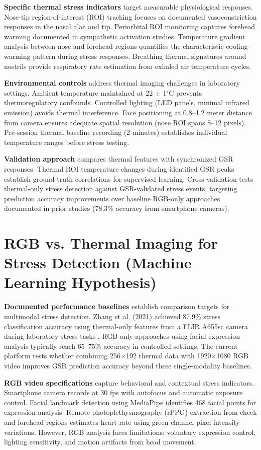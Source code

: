 \textbf{Specific thermal stress indicators} target measurable physiological responses. Nose-tip region-of-interest (ROI) tracking focuses on documented vasoconstriction responses in the nasal alae and tip. Periorbital ROI monitoring captures forehead warming documented in sympathetic activation studies. Temperature gradient analysis between nose and forehead regions quantifies the characteristic cooling-warming pattern during stress responses. Breathing thermal signatures around nostrils provide respiratory rate estimation from exhaled air temperature cycles.

\textbf{Environmental controls} address thermal imaging challenges in laboratory settings. Ambient temperature maintained at 22 $\pm$ 1$^\circ$C prevents thermoregulatory confounds. Controlled lighting (LED panels, minimal infrared emission) avoids thermal interference. Face positioning at 0.8--1.2 meter distance from camera ensures adequate spatial resolution (nose ROI spans 8--12 pixels). Pre-session thermal baseline recording (2 minutes) establishes individual temperature ranges before stress testing.

\textbf{Validation approach} compares thermal features with synchronized GSR responses. Thermal ROI temperature changes during identified GSR peaks establish ground truth correlations for supervised learning. Cross-validation tests thermal-only stress detection against GSR-validated stress events, targeting prediction accuracy improvements over baseline RGB-only approaches documented in prior studies (78.3\% accuracy from smartphone cameras).

\section{RGB vs. Thermal Imaging for Stress Detection (Machine Learning Hypothesis)}
\textbf{Documented performance baselines} establish comparison targets for multimodal stress detection. Zhang et al. (2021) achieved 87.9\% stress classification accuracy using thermal-only features from a FLIR A655sc camera during laboratory stress tasks \cite{ref5}. RGB-only approaches using facial expression analysis typically reach 65--75\% accuracy in controlled settings. The current platform tests whether combining 256$\times$192 thermal data with 1920$\times$1080 RGB video improves GSR prediction accuracy beyond these single-modality baselines.

\textbf{RGB video specifications} capture behavioral and contextual stress indicators. Smartphone camera records at 30 fps with autofocus and automatic exposure control. Facial landmark detection using MediaPipe identifies 468 facial points for expression analysis. Remote photoplethysmography (rPPG) extraction from cheek and forehead regions estimates heart rate using green channel pixel intensity variations. However, RGB analysis faces limitations: voluntary expression control, lighting sensitivity, and motion artifacts from head movement.

